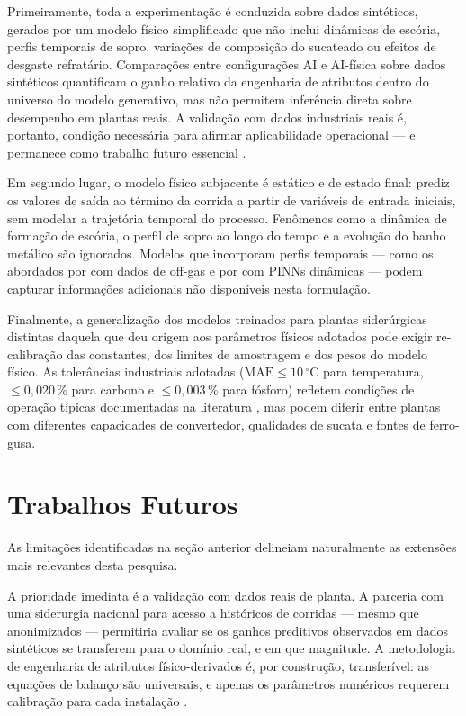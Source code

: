 Primeiramente, toda a experimentação é conduzida sobre dados sintéticos, gerados por um modelo físico simplificado que não inclui dinâmicas de escória, perfis temporais de sopro, variações de composição do sucateado ou efeitos de desgaste refratário. Comparações entre configurações AI e AI-física sobre dados sintéticos quantificam o ganho relativo da engenharia de atributos dentro do universo do modelo generativo, mas não permitem inferência direta sobre desempenho em plantas reais. A validação com dados industriais reais é, portanto, condição necessária para afirmar aplicabilidade operacional --- e permanece como trabalho futuro essencial \cite{buggineni2024synthetic,morales2025synthetic}.

Em segundo lugar, o modelo físico subjacente é estático e de estado final: prediz os valores de saída ao término da corrida a partir de variáveis de entrada iniciais, sem modelar a trajetória temporal do processo. Fenômenos como a dinâmica de formação de escória, o perfil de sopro ao longo do tempo e a evolução do banho metálico são ignorados. Modelos que incorporam perfis temporais --- como os abordados por  com dados de off-gas e por  com PINNs dinâmicas --- podem capturar informações adicionais não disponíveis nesta formulação.

Finalmente, a generalização dos modelos treinados para plantas siderúrgicas distintas daquela que deu origem aos parâmetros físicos adotados pode exigir re-calibração das constantes, dos limites de amostragem e dos pesos do modelo físico. As tolerâncias industriais adotadas ($\text{MAE} \leq 10\,^\circ\text{C}$ para temperatura, $\leq 0{,}020\,\%$ para carbono e $\leq 0{,}003\,\%$ para fósforo) refletem condições de operação típicas documentadas na literatura \cite{zhou2024bof,bae2020bof}, mas podem diferir entre plantas com diferentes capacidades de convertedor, qualidades de sucata e fontes de ferro-gusa.


\section{Trabalhos Futuros}
\label{sec:trabalhos-futuros}

As limitações identificadas na seção anterior delineiam naturalmente as extensões mais relevantes desta pesquisa.

A prioridade imediata é a validação com dados reais de planta. A parceria com uma siderurgia nacional para acesso a históricos de corridas --- mesmo que anonimizados --- permitiria avaliar se os ganhos preditivos observados em dados sintéticos se transferem para o domínio real, e em que magnitude. A metodologia de engenharia de atributos físico-derivados é, por construção, transferível: as equações de balanço são universais, e apenas os parâmetros numéricos requerem calibração para cada instalação \cite{chattopadhyay2022hybrid,shao2024hybrid}.

